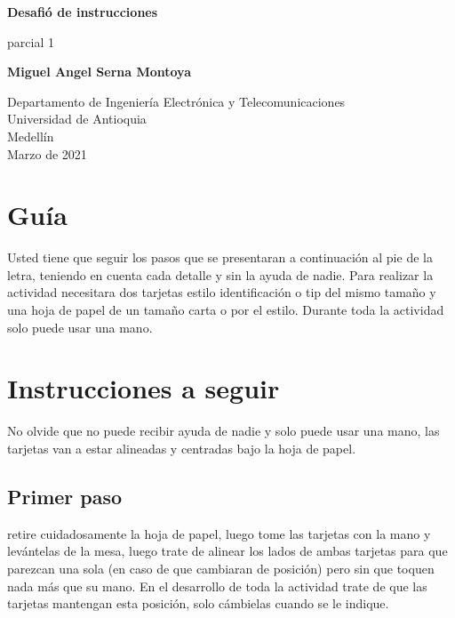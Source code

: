 \documentclass{article}
\begin{document}
\begin{titlepage}
    \begin{center}
        \vspace*{1cm}
            
        \Huge
        \textbf{Desafió de instrucciones }
            
        \vspace{0.5cm}
        \LARGE
        parcial 1
            
        \vspace{1.5cm}
            
        \textbf{Miguel Angel Serna Montoya}
            
        \vfill
            
        \vspace{0.8cm}
            
        \Large
        Departamento de Ingeniería Electrónica y Telecomunicaciones\\
        Universidad de Antioquia\\
        Medellín\\
        Marzo de 2021
            
    \end{center}
\end{titlepage}

\tableofcontents

\section{Guía}
Usted tiene que seguir los pasos que se presentaran a continuación al pie de la letra, teniendo en cuenta cada detalle y sin la ayuda de nadie. Para realizar la actividad  necesitara dos tarjetas estilo identificación o tip del mismo tamaño y una hoja de papel de un tamaño carta o por el estilo. Durante toda la actividad solo puede usar una mano.

\section{Instrucciones a seguir} \label{contenido}

No olvide que no puede recibir ayuda de nadie y solo puede usar una mano, las tarjetas van a estar alineadas y centradas bajo la hoja de papel.
\subsection{Primer paso} \label{contenido}
retire cuidadosamente la hoja de papel, luego tome las tarjetas con la mano y levántelas de la mesa, luego trate de alinear los lados de ambas tarjetas para que parezcan una sola (en caso de que cambiaran de posición) pero sin que toquen nada más que su mano. En el desarrollo de toda la actividad trate de que las tarjetas mantengan esta posición, solo cámbielas cuando se le indique.
\end{document}
